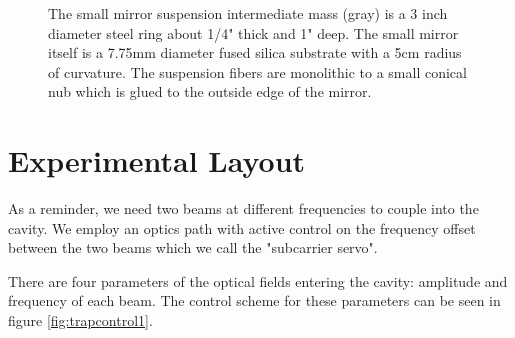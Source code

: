 \begin{figure}
\centering
{}
\caption[Small Mirror Suspension]{The small mirror suspension intermediate
         mass (gray) is a 3 inch diameter steel ring about 1/4" thick and 1"
         deep. The small mirror itself is a 7.75mm diameter fused silica
         substrate with a 5cm radius of curvature. The suspension fibers are
         monolithic to a small conical nub which is glued to the outside edge
         of the mirror.}
\label{fig:smallsus}
\end{figure}

\section{Experimental Layout}

As a reminder, we need two beams at different frequencies to couple into the
cavity.
We employ an optics path with active control on the frequency offset between
the two beams which we call the "subcarrier servo".

There are four parameters of the optical fields entering the cavity:
amplitude and frequency of each beam.
The control scheme for these parameters can be seen in figure
\ref{fig:trapcontrol1}.


